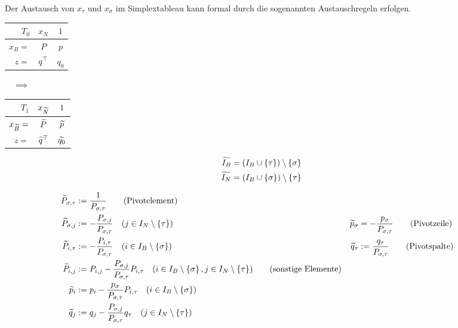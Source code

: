 Der Austausch von $x_\tau$ und $x_\sigma$ im Simplextableau kann formal durch die sogenannten Austauschregeln erfolgen.

\begin{center}
	\begin{minipage}{\dimexpr0.6\linewidth-\fboxrule-\fboxsep}
		\centering
		\begin{tabular}{r|c|c}
			$T_0$ & $x_N$ & $1$ \\ \hline
			$x_B = $ & $P$ & $p$ \\ \hline
			$z =$ & $q^{\top}$ & $q_0$
		\end{tabular}
		$\quad \implies \quad$
		\begin{tabular}{r|c|c}
			$T_1$ & $x_{\widetilde{N}}$ & $1$ \\ \hline
			$x_{\widetilde{B}} = $ & $\widetilde{P}$ & $\widetilde{p}$ \\ \hline
			$z =$ & $\widetilde{q}^{\top}$ & $\widetilde{q_0}$
		\end{tabular}
	\end{minipage}
	\begin{minipage}{\dimexpr0.4\linewidth-\fboxrule-\fboxsep}
		\begin{equation*}
			\begin{aligned}
			\widetilde{I_B} &= \left( I_B \cup \left\{ \tau \right\} \right) \setminus \left\{ \sigma \right\} \\
			\widetilde{I_N} &= \left( I_B \cup \left\{ \sigma \right\} \right) \setminus \left\{ \tau \right\}
			\end{aligned}
		\end{equation*}
	\end{minipage}
\end{center}
\vspace{\parskip}

\begin{align*}
	\widetilde{P}_{\sigma , \tau} &\mathrel{:=} \frac{1}{P_{\sigma,  \tau}} 
	\tag{Pivotelement} \\
	\widetilde{P}_{\sigma, j} &\mathrel{:=} - \frac{P_{\sigma, j}}{P_{\sigma, \tau}} \quad (j \in I_N \setminus \left\{ \tau \right\}) & \widetilde{p}_\sigma &= - \frac{p_\sigma}{P_{\sigma, \tau}} 
	\tag{Pivotzeile} \\
	\widetilde{P}_{i, \tau} &\mathrel{:=} - \frac{P_{i, \tau}}{P_{\sigma, \tau}} \quad (i \in I_B \setminus \left\{ \sigma \right\}) & \widetilde{q}_\tau &\mathrel{:=} \frac{q_\tau}{P_{\sigma, \tau}}
	\tag{Pivotspalte} \\
	\widetilde{P}_{i,j} &\mathrel{:=} P_{i,j} - \frac{P_{\sigma, j}}{P_{\sigma, \tau}} P_{i,\tau} \quad (i \in I_B \setminus \left\{ \sigma \right\} , j \in I_N \setminus \left\{ \tau \right\}) 
	\tag{sonstige Elemente}\\
	\widetilde{p}_i &\mathrel{:=} p_i - \frac{p_\sigma}{P_{\sigma, \tau}} P_{i,\tau} \quad (i \in I_B \setminus \left\{ \sigma \right\}) \\
	\widetilde{q}_j &\mathrel{:=} q_j - \frac{P_{\sigma, j}}{P_{\sigma, \tau}} q_\tau \quad (j \in I_N \setminus \left\{ \tau \right\}) \\
\end{align*}

